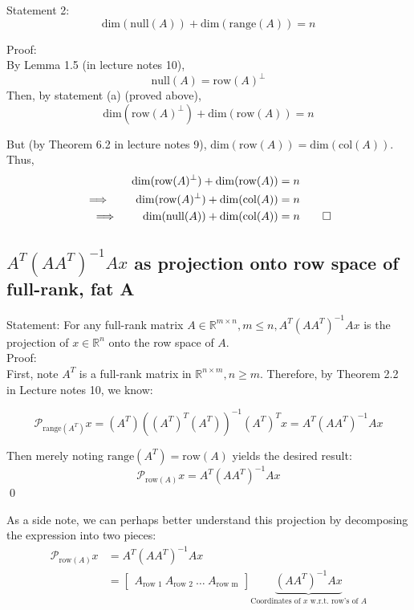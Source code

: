 \documentclass[paper=a4, fontsize=11pt]{scrartcl} %
\numberwithin{equation}{section} %
\numberwithin{figure}{section} %
\numberwithin{table}{section} %
\begin{document}
Statement 2:
\[\mathrm{dim}(\mathrm{null}(A)) + \mathrm{dim}(\mathrm{range}(A)) = n\]

Proof:\\

By Lemma 1.5 (in lecture notes 10),
\[\mathrm{null}(A) = \mathrm{row}(A)^{\perp}\]
Then, by statement (a) (proved above),
\[\mathrm{dim}(\mathrm{row}(A)^{\perp})+ \mathrm{dim}(\mathrm{row}(A)) = n\]

But (by Theorem 6.2 in lecture notes 9), $\mathrm{dim}(\mathrm{row}(A)) = \mathrm{dim}(\mathrm{col}(A))$. Thus,
\begin{align*}
\mathrm{dim}(\mathrm{row}(A)^{\perp})+ \mathrm{dim}(\mathrm{row}(A)) &= n \\
 \implies \qquad{} \mathrm{dim}(\mathrm{row}(A)^{\perp}) + \mathrm{dim}(\mathrm{col}(A)) &= n \\
\implies \qquad{}\mathrm{dim}(\mathrm{null}(A)) + \mathrm{dim}(\mathrm{col}(A)) &=n \qed
\end{align*}

\subsection{$A^T(AA^T)^{-1}Ax$ as projection onto row space of full-rank, fat A}

Statement: For any full-rank matrix $A \in \mathbb{R}^{m \times n}, m \leq n, A^T(AA^T)^{-1}Ax$ is the projection of $x \in \mathbb{R}^n$ onto the row space of $A$. \\

Proof: \\

First, note $A^T$ is a full-rank matrix in $\mathbb{R}^{n \times m}, n \geq m$. Therefore, by Theorem 2.2 in Lecture notes 10, we know:

\[\mathcal{P}_{\textrm{range}(A^T)} x = (A^T)((A^T)^T(A^T))^{-1}(A^T)^Tx = A^T(AA^T)^{-1}Ax\]

Then merely noting $\textrm{range}(A^T) = \textrm{row}(A)$ yields the desired result:
\[\mathcal{P}_{\textrm{row}(A)} x =  A^T(AA^T)^{-1}Ax\] \qed

As a side note, we can perhaps better understand this projection by decomposing the expression into two pieces:
\begin{align*}
\mathcal{P}_{\textrm{row}(A)} x &=  A^T(AA^T)^{-1}Ax \\
   &= \left[\begin{matrix} A_{\textrm{row 1}} \ A_{\textrm{row 2}} \ \dots \ A_{\textrm{row m}} \end{matrix}\right] \underbrace{(AA^T)^{-1}Ax}_{\text{Coordinates of $x$ w.r.t. row's of $A$}}
\end{align*}
\end{document}
